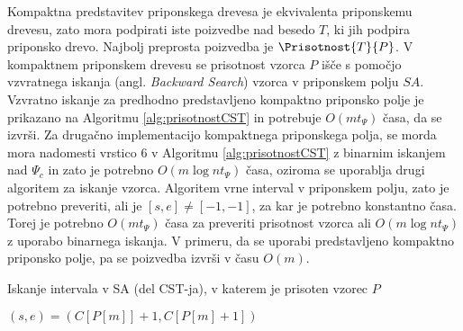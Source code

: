Kompaktna predstavitev priponskega drevesa je ekvivalenta priponskemu drevesu, zato mora podpirati iste poizvedbe nad besedo $T$, ki jih podpira priponsko drevo. Najbolj preprosta poizvedba je $\Prisotnost{T}{P}$. V kompaktnem priponskem drevesu se prisotnost vzorca $P$ išče s pomočjo vzvratnega iskanja (angl. \textit{Backward Search}) vzorca v priponskem polju $SA$. Vzvratno iskanje za predhodno predstavljeno kompaktno priponsko polje je prikazano na Algoritmu \ref{alg:prisotnostCST} in potrebuje $O(mt_\Psi)$ časa, da se izvrši. Za drugačno implementacijo kompaktnega priponskega polja, se morda mora nadomesti vrstico 6 v Algoritmu \ref{alg:prisotnostCST} z binarnim iskanjem nad $\Psi_c$ in zato je potrebno $O(m\log{n}t_\Psi)$ časa, oziroma se uporablja drugi algoritem za iskanje vzorca. Algoritem vrne interval v priponskem polju, zato je potrebno preveriti, ali je $[s,e]\ne[-1,-1]$, za kar je potrebno konstantno časa. Torej je potrebno $O(mt_\Psi)$ časa za preveriti prisotnost vzorca ali $O(m\log{n}t_\Psi)$ z uporabo binarnega iskanja. V primeru, da se uporabi predstavljeno kompaktno priponsko polje, pa se poizvedba izvrši v času $O(m)$. 

\begin{algorithm}[tb]

\caption{Iskanje intervala v SA (del CST-ja), v katerem je prisoten vzorec $P$ \cite{Navarro2016}}\label{alg:prisotnostCST}    
{
    {$(s,e)=(C[P[m]]+1,C[P[m]+1])$}
    


    {\KwRet{$[s,e]$}}
}

\end{algorithm}

